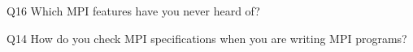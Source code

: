 \begin{description}%
\item{Q16} Which MPI features have you never heard of?%
\item{Q14} How do you check MPI specifications when you are writing MPI programs?%
\end{description}%
